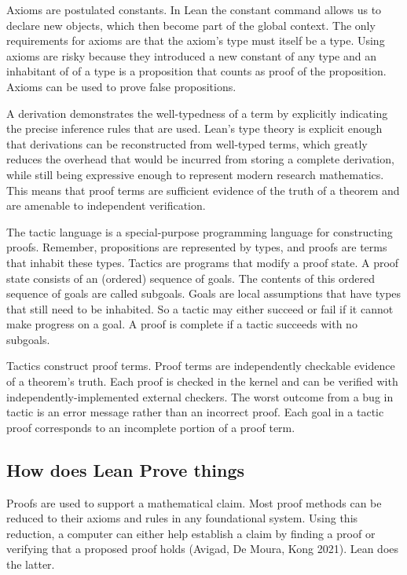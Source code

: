 \documentclass{article}
\newcommand{\1}{\mathbbm{1}}
\theoremstyle{plain}
\theoremstyle{definition}
\numberwithin{equation}{section}
\begin{document}
Axioms are postulated constants. In Lean the constant command allows us to declare new objects, which then become part of the global context. The only requirements for axioms are that the axiom’s type must itself be a type. Using axioms are risky because they introduced a new constant of any type and an inhabitant of of a type is a proposition that counts as proof of the proposition. Axioms can be used to prove false propositions. 

A derivation demonstrates the well-typedness of a term by explicitly indicating the precise inference rules that are used. Lean's type theory is explicit enough that derivations can be reconstructed from well-typed terms, which greatly reduces the overhead that would be incurred from storing a complete derivation, while still being expressive enough to represent modern research mathematics. This means that proof terms are sufficient evidence of the truth of a theorem and are amenable to independent verification.

The tactic language is a special-purpose programming language for constructing proofs. Remember, propositions are represented by types, and proofs are terms that inhabit these types. Tactics are programs that modify a proof state. A proof state consists of an (ordered) sequence of goals. The contents of this ordered sequence of goals are called subgoals. Goals are local assumptions that have types that still need to be inhabited. So a tactic may either succeed or fail if it cannot make progress on a goal. A proof is complete if a tactic succeeds with no subgoals.  

Tactics construct proof terms. Proof terms are independently checkable evidence of a theorem’s truth. Each proof is checked in the kernel and can be verified with independently-implemented external checkers. The worst outcome from a bug in tactic is an error message rather than an incorrect proof. Each goal in a tactic proof corresponds to an incomplete portion of a proof term. 

\subsection{How does Lean Prove things}

Proofs are used to support a mathematical claim. Most proof methods can be reduced to their axioms and rules in any foundational system. Using this reduction, a computer can either help establish a claim by finding a proof or verifying that a proposed proof holds (Avigad, De Moura,  Kong 2021). Lean does the latter. 
\end{document}
